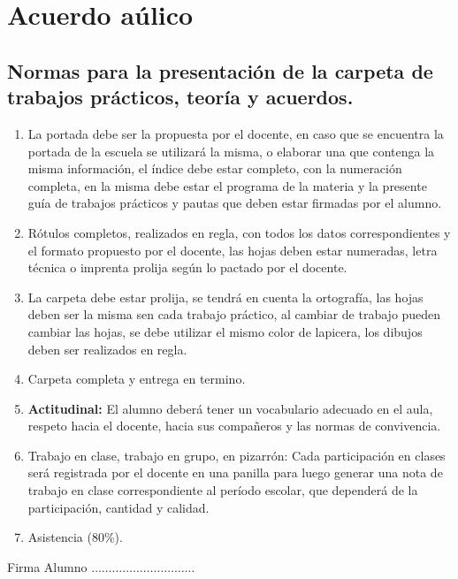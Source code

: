\documentclass[../main]{subfiles}
\begin{document}
\section{Acuerdo aúlico}
\subsection*{Normas para la presentación de la carpeta de trabajos
prácticos, teoría y acuerdos.}
\begin{enumerate}
  \item La portada debe ser la propuesta por el docente, en caso que se
    encuentra la portada de la escuela se utilizará la misma, o elaborar
    una que contenga la misma información, el índice debe estar completo,
    con la numeración completa, en la misma debe estar el programa de la
    materia y la presente guía de trabajos prácticos y pautas que deben
    estar firmadas por el alumno.
  \item Rótulos completos, realizados en regla, con todos los datos
    correspondientes y el formato propuesto por el docente, las hojas deben
    estar numeradas, letra técnica o imprenta prolija según lo pactado
    por el docente.
  \item La carpeta debe estar prolija, se tendrá en cuenta la ortografía,
    las hojas deben ser la misma sen cada trabajo práctico,
    al cambiar de trabajo pueden cambiar las hojas, se debe utilizar
    el mismo color de lapicera, los dibujos deben ser realizados en regla.
  \item Carpeta completa y entrega en termino.
  \item \textbf{Actitudinal:} El alumno deberá tener un vocabulario
    adecuado en el aula, respeto hacia el docente, hacia sus
    compañeros y las normas de convivencia.
  \item Trabajo en clase, trabajo en grupo, en pizarrón: Cada
    participación en clases será registrada por el docente en una
    panilla para luego generar una nota de trabajo en clase
    correspondiente al período escolar, que dependerá de la
    participación, cantidad y calidad.
  \item Asistencia (80\%).
\end{enumerate}
\vspace{1cm}
\begin{center}
  Firma Alumno $\dots\dots\dots\dots\dots\dots\dots\dots\dots\dots$
\end{center}
\end{document}
